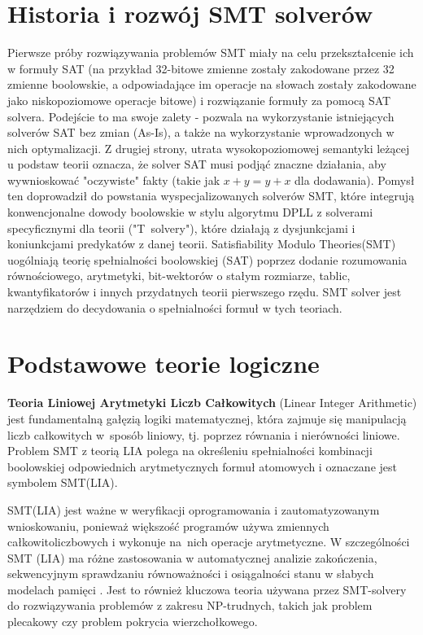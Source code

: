 \section{Historia i rozwój SMT solverów}
Pierwsze próby rozwiązywania problemów SMT miały na celu przekształcenie ich w formuły SAT (na przykład 32-bitowe zmienne zostały zakodowane przez 32 zmienne boolowskie, a odpowiadające im operacje na słowach zostały zakodowane jako niskopoziomowe operacje bitowe) i rozwiązanie formuły za pomocą SAT solvera. Podejście to ma swoje zalety - pozwala na wykorzystanie istniejących solverów SAT bez zmian (As-Is), a także na wykorzystanie wprowadzonych w nich optymalizacji. Z drugiej strony, utrata wysokopoziomowej semantyki leżącej u podstaw teorii oznacza, że solver SAT musi podjąć znaczne działania, aby wywnioskować "oczywiste" fakty (takie jak $x + y = y + x$ dla dodawania). Pomysł ten doprowadził do powstania wyspecjalizowanych solverów SMT, które integrują konwencjonalne dowody boolowskie w stylu algorytmu DPLL z solverami specyficznymi dla teorii ("T~solvery"), które działają z dysjunkcjami i koniunkcjami predykatów z danej teorii. 
Satisfiability Modulo Theories(SMT) uogólniają teorię spełnialności boolowskiej (SAT) poprzez dodanie rozumowania równościowego, arytmetyki, bit-wektorów o stałym rozmiarze, tablic, kwantyfikatorów i innych przydatnych teorii pierwszego rzędu.
SMT solver jest narzędziem do decydowania o spełnialności formuł w tych teoriach. 

\section{Podstawowe teorie logiczne}

\textbf{Teoria Liniowej Arytmetyki Liczb Całkowitych} (Linear Integer Arithmetic) jest fundamentalną gałęzią logiki matematycznej, która zajmuje się manipulacją liczb całkowitych w~sposób liniowy, tj. poprzez równania i nierówności liniowe. Problem SMT z teorią LIA polega na określeniu spełnialności kombinacji boolowskiej odpowiednich arytmetycznych formuł atomowych i oznaczane jest symbolem SMT(LIA). 

SMT(LIA) jest ważne w weryfikacji oprogramowania i zautomatyzowanym wnioskowaniu, ponieważ większość programów używa zmiennych całkowitoliczbowych i wykonuje na~nich operacje arytmetyczne. W szczególności SMT (LIA) ma różne zastosowania w automatycznej analizie zakończenia, sekwencyjnym sprawdzaniu równoważności i osiągalności stanu w słabych modelach pamięci \cite{CaiLZ22}. Jest to również kluczowa teoria używana przez SMT-solvery do rozwiązywania problemów z zakresu NP-trudnych, takich jak problem plecakowy czy problem pokrycia wierzchołkowego.

